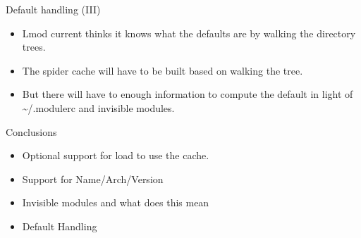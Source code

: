 \documentclass{beamer}
\begin{document}
\begin{frame}{Default handling (III)}
  \begin{itemize}
    \item Lmod current thinks it knows what the defaults are by
      walking the directory trees.
    \item The spider cache will have to be built based on walking the
      tree.
    \item But there will have to enough information to compute the
      default in light of \textasciitilde/.modulerc and invisible modules.
  \end{itemize}
\end{frame}

\begin{frame}{Conclusions}
  \begin{itemize}
    \item Optional support for load to use the cache.
    \item Support for Name/Arch/Version
    \item Invisible modules and what does this mean
    \item Default Handling  
  \end{itemize}
\end{frame}
\end{document}
